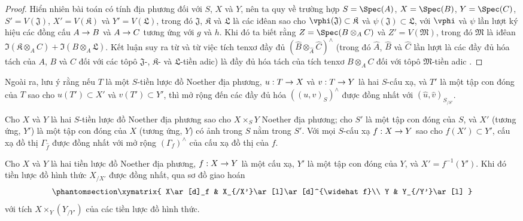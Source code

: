 \documentclass[oneside]{amsart}
\makeatletter
\newcommand{\ega@arrow}[2]{\mathchoice{#1}{#2}{#2}{#2}}
\renewcommand{\to}{\ega@arrow{\longrightarrow}{\rightarrow}}
\let\EGAOriginalLabel\label
\renewcommand{\label}[1]{\phantomsection\EGAOriginalLabel{#1}}
\makeatother
\begin{document}
\begin{proof}
Hiển nhiên bài toán có tính địa phương đối với $S$, $X$ và $Y$, nên ta quy về trường hợp $S=\Spec(A)$, $X=\Spec(B)$, $Y=\Spec(C)$, $S'=V(\mathfrak{J})$, $X'=V(\mathfrak{K})$ và $Y'=V(\mathfrak{L})$, trong đó $\mathfrak{J}$, $\mathfrak{K}$ và $\mathfrak{L}$ là các iđêan sao cho $\vphi(\mathfrak{J})\subset\mathfrak{K}$ và $\psi(\mathfrak{J})\subset\mathfrak{L}$, với $\vphi$ và $\psi$ lần lượt ký hiệu các đồng cấu $A\to B$ và $A\to C$ tương ứng với $g$ và $h$.
Khi đó ta biết rằng $Z=\Spec(B\otimes_A C)$ và $Z'=V(\mathfrak{M})$, trong đó $\mathfrak{M}$ là iđêan $\Im(\mathfrak{K}\otimes_A C)+\Im(B\otimes_A\mathfrak{L})$.
Kết luận suy ra từ  và từ việc tích tenxơ đầy đủ $(\widehat{B}\otimes_{\widehat{A}}\widehat{C})^\wedge$ (trong đó $\widehat{A}$, $\widehat{B}$ và $\widehat{C}$ lần lượt là các đầy đủ hóa tách của $A$, $B$ và $C$ đối với các tôpô $\mathfrak{J}$-, $\mathfrak{K}$- và $\mathfrak{L}$-tiền adic) là đầy đủ hóa tách của tích tenxơ $B\otimes_A C$ đối với tôpô $\mathfrak{M}$-tiền adic .
\end{proof}

Ngoài ra, lưu ý rằng nếu $T$ là một $S$-tiền lược đồ Noether địa phương, $u:T\to X$ và $v:T\to Y$ là hai $S$-cấu xạ, và $T'$ là một tập con đóng của $T$ sao cho $u(T')\subset X'$ và $v(T')\subset Y'$, thì mở rộng đến các đầy đủ hóa $((u,v)_S)^\wedge$ được đồng nhất với $(\widehat{u},\widehat{v})_{S_{/S'}}$.

\begin{corollary}[10.9.8]
\label{I.10.9.8}
Cho $X$ và $Y$ là hai $S$-tiền lược đồ Noether địa phương sao cho $X\times_S Y$ Noether địa phương; cho $S'$ là một tập con đóng của $S$, và $X'$ (tương ứng, $Y'$) là một tập con đóng của $X$ (tương ứng, $Y$) có ảnh trong $S$ nằm trong $S'$.
Với mọi $S$-cấu xạ $f:X\to Y$ sao cho $f(X')\subset Y'$, cấu xạ đồ thị $\Gamma_{\widehat f}$ được đồng nhất với mở rộng $(\Gamma_f)^\wedge$ của cấu xạ đồ thị của $f$.
\end{corollary}

\begin{corollary}[10.9.9]
\label{I.10.9.9}
Cho $X$ và $Y$ là hai tiền lược đồ Noether địa phương, $f:X\to Y$ là một cấu xạ, $Y'$ là một tập con đóng của $Y$, và $X'=f^{-1}(Y')$.
Khi đó tiền lược đồ hình thức $X_{/X'}$ được đồng nhất, qua sơ đồ giao hoán
\[
  \label{I.10.9.9.1}
  \xymatrix{
    X\ar[d]_f &
    X_{/X'}\ar[l]\ar[d]^{\widehat f}\\
    Y &
    Y_{/Y'}\ar[l]
  }
\]
với tích $X\times_Y(Y_{/Y'})$ của các tiền lược đồ hình thức.
\end{corollary}
\end{document}

